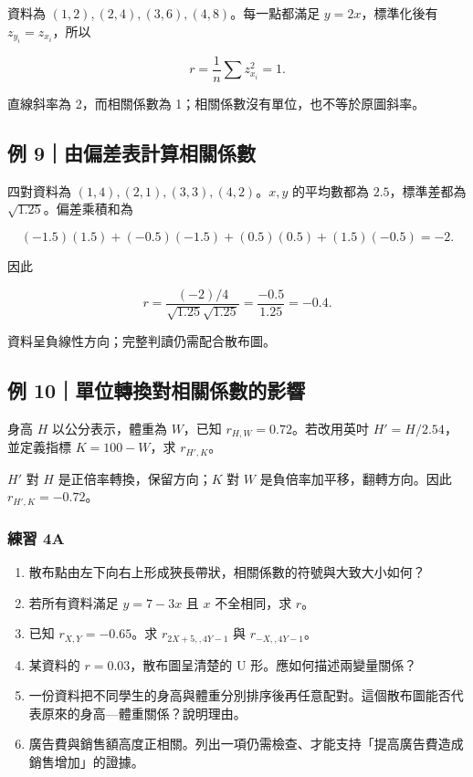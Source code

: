 \documentclass[11pt,a4paper]{article}
\providecommand{\tightlist}{%
  \setlength{\itemsep}{0pt}\setlength{\parskip}{0pt}}
\begin{document}
資料為 \((1,2),(2,4),(3,6),(4,8)\)。每一點都滿足 \(y=2x\)，標準化後有 \(z_{y_i}=z_{x_i}\)，所以

\[
r=\frac1n\sum z_{x_i}^2=\boxed{1}.
\]

直線斜率為 2，而相關係數為 1；相關係數沒有單位，也不等於原圖斜率。

\subsection{例 9｜由偏差表計算相關係數}\label{ux4f8b-9ux7531ux504fux5deeux8868ux8a08ux7b97ux76f8ux95dcux4fc2ux6578}

四對資料為 \((1,4),(2,1),(3,3),(4,2)\)。\(x,y\) 的平均數都為 \(2.5\)，標準差都為 \(\sqrt{1.25}\)。偏差乘積和為

\[
(-1.5)(1.5)+(-0.5)(-1.5)+(0.5)(0.5)+(1.5)(-0.5)=-2.
\]

因此

\[
r=\frac{(-2)/4}{\sqrt{1.25}\sqrt{1.25}}=\frac{-0.5}{1.25}=\boxed{-0.4}.
\]

資料呈負線性方向；完整判讀仍需配合散布圖。

\subsection{例 10｜單位轉換對相關係數的影響}\label{ux4f8b-10ux55aeux4f4dux8f49ux63dbux5c0dux76f8ux95dcux4fc2ux6578ux7684ux5f71ux97ff}

身高 \(H\) 以公分表示，體重為 \(W\)，已知 \(r_{H,W}=0.72\)。若改用英吋 \(H'=H/2.54\)，並定義指標 \(K=100-W\)，求 \(r_{H',K}\)。

\(H'\) 對 \(H\) 是正倍率轉換，保留方向；\(K\) 對 \(W\) 是負倍率加平移，翻轉方向。因此 \(\boxed{r_{H',K}=-0.72}\)。

\subsubsection{練習 4A}\label{ux7df4ux7fd2-4a}

\begin{enumerate}
\def\labelenumi{\arabic{enumi}.}
\tightlist
\item
  散布點由左下向右上形成狹長帶狀，相關係數的符號與大致大小如何？
\item
  若所有資料滿足 \(y=7-3x\) 且 \(x\) 不全相同，求 \(r\)。
\item
  已知 \(r_{X,Y}=-0.65\)。求 \(r_{2X+5,,4Y-1}\) 與 \(r_{-X,,4Y-1}\)。
\item
  某資料的 \(r=0.03\)，散布圖呈清楚的 U 形。應如何描述兩變量關係？
\item
  一份資料把不同學生的身高與體重分別排序後再任意配對。這個散布圖能否代表原來的身高---體重關係？說明理由。
\item
  廣告費與銷售額高度正相關。列出一項仍需檢查、才能支持「提高廣告費造成銷售增加」的證據。
\end{enumerate}
\end{document}

